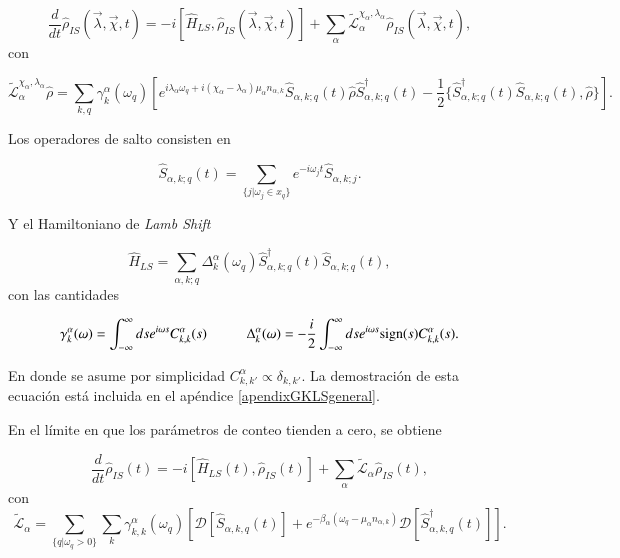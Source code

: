 \begin{equation*}
    \frac{d}{dt}\hat{\rho}_{IS}(\vec{\lambda},\vec{\chi},t) = -i[\hat{H}_{LS},\hat{\rho}_{IS}(\vec{\lambda},\vec{\chi},t)] + \sum_{\alpha}\tilde{\mathcal{L}}^{\chi_{\alpha},\lambda_{\alpha}}_{\alpha} \hat{\rho}_{IS}(\vec{\lambda},\vec{\chi},t),
\end{equation*}
con

\begin{equation*}
    \tilde{\mathcal{L}}^{\chi_{\alpha},\lambda_{\alpha}}_{\alpha}\hat{\rho} = \sum_{k,q}\gamma^{\alpha}_{k}(\omega_{q}) \left[e^{i\lambda_{\alpha}\omega_{q} + i(\chi_{\alpha}-\lambda_{\alpha})\mu_{\alpha}n_{\alpha,k}}\hat{S}_{\alpha,k;q}(t)\hat{\rho}\hat{S}^{\dagger}_{\alpha,k;q}(t) - \frac{1}{2}\{\hat{S}^{\dagger}_{\alpha,k;q}(t)\hat{S}_{\alpha,k;q}(t),\hat{\rho} \} \right].
\end{equation*}

Los operadores de salto consisten en

\begin{equation*}
    \hat{S}_{\alpha,k;q}(t) = \sum_{\{j|\omega_{j}\in x_{q} \} } e^{-i\omega_{j}t}\hat{S}_{\alpha,k;j}.
\end{equation*}

Y el Hamiltoniano de \textit{Lamb Shift}

\begin{equation*}
    \hat{H}_{LS} = \sum_{\alpha,k;q} \Delta^{\alpha}_{k}(\omega_{q}) \hat{S}^{\dagger}_{\alpha,k;q}(t)\hat{S}_{\alpha,k;q}(t),
\end{equation*}
con las cantidades

\begin{equation*}
    \gamma_{k}^{\alpha}(\omega) = \int_{-\infty}^{\infty}ds e^{i\omega s}C^{\alpha}_{k,k}(s) \hspace{10mm} \Delta^{\alpha}_{k}(\omega) = - \frac{i}{2} \int^{\infty}_{-\infty}ds e^{i\omega s} \text{sign}(s)C^{\alpha}_{k,k}(s).
\end{equation*}

En donde se asume por simplicidad $C^{\alpha}_{k,k'} \propto \delta_{k,k'}$. La demostración de esta ecuación está incluida en el apéndice \ref{apendixGKLSgeneral}. 

En el límite en que los parámetros de conteo tienden a cero, se obtiene  

\begin{equation*}
    \frac{d}{dt}\hat{\rho}_{IS}(t) = - i[\hat{H}_{LS}(t),\hat{\rho}_{IS}(t)] + \sum_{\alpha}\tilde{\mathcal{L}}_{\alpha} \hat{\rho}_{IS}(t),
\end{equation*}
con
\begin{equation*}
    \tilde{\mathcal{L}}_{\alpha} = \sum_{\{q|\omega_{q}>0\}} \sum_{k}\gamma^{\alpha}_{k,k}(\omega_{q}) \left[ \mathcal{D}[\hat{S}_{\alpha,k,q}(t)] + e^{-\beta_{\alpha}(\omega_{q} - \mu_{\alpha}n_{\alpha,k})}\mathcal{D}[\hat{S}^{\dagger}_{\alpha,k,q}(t)]  \right].
\end{equation*}


